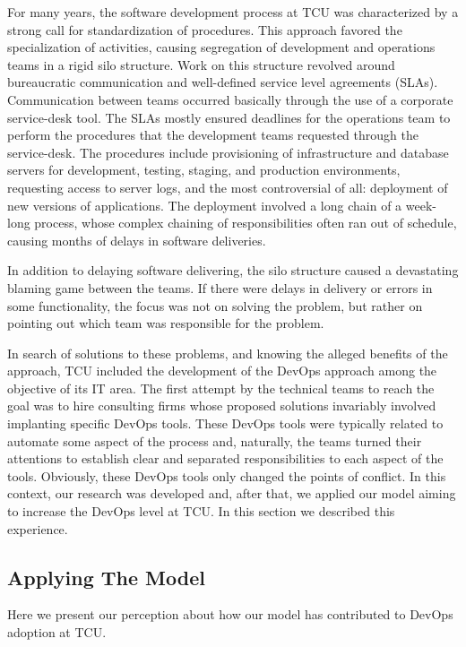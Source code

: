 {
\color{blue}
For many years, the software development process at TCU was characterized by a strong call
for standardization of procedures. This approach favored the specialization of
activities, causing segregation of development and operations teams in a rigid
silo structure. Work on this structure revolved around bureaucratic
communication and well-defined service level agreements (SLAs). Communication
between teams occurred basically through the use of a corporate service-desk tool.
The SLAs mostly ensured deadlines for the operations team to perform the
procedures that the development teams requested through the service-desk. The
procedures include provisioning of infrastructure and database servers for
development, testing, staging, and production environments, requesting access
to server logs, and the most controversial of all: deployment of new versions
of applications. The deployment involved a long chain of a week-long process,
whose complex chaining of responsibilities often ran out of schedule, causing
months of delays in software deliveries.

In addition to delaying software delivering, the silo structure caused a
devastating blaming game between the teams. If there were delays in delivery
or errors in some functionality, the focus was not on solving the problem, but
rather on pointing out which team was responsible for the problem.

In search of solutions to these problems, and knowing the alleged benefits of
the approach, TCU included the development of the DevOps approach among the
objective of its IT area. The first attempt by the technical teams to reach the
goal was to hire consulting firms whose proposed solutions invariably involved
implanting specific DevOps tools. These DevOps tools were typically related to
automate some aspect of the process and, naturally, the teams turned their
attentions to establish clear and separated responsibilities to each aspect of
the tools. Obviously, these DevOps tools only changed the points of conflict.
In this context, our research was developed and, after that, we applied our
model aiming to increase the DevOps level at TCU. In this section we described
this experience.
}

\subsection{Applying The Model}

Here we present our perception about how our model has contributed to DevOps
adoption at TCU.

